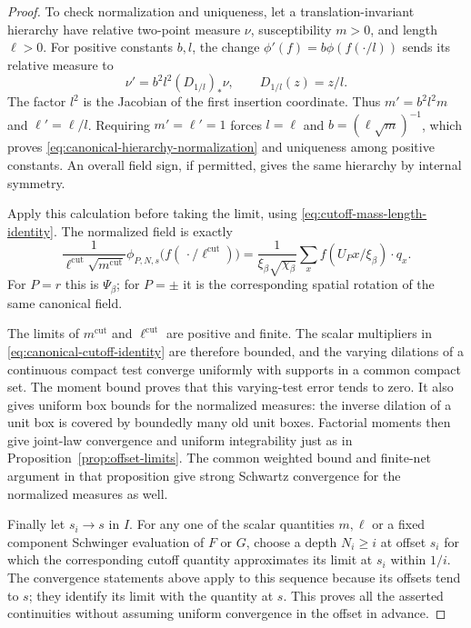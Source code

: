 \begin{proof}
To check normalization and uniqueness, let a translation-invariant
hierarchy have relative two-point measure $\nu$, susceptibility $m>0$,
and length $\ell>0$.  For positive constants $b,l$, the change
$\phi'(f)=b\phi(f(\cdot/l))$ sends its relative measure to
\[
 \nu'=b^2l^2(D_{1/l})_*\nu,\qquad D_{1/l}(z)=z/l.
\]
The factor $l^2$ is the Jacobian of the first insertion coordinate.
Thus $m'=b^2l^2m$ and $\ell'=\ell/l$.  Requiring $m'=\ell'=1$
forces $l=\ell$ and $b=(\ell\sqrt m)^{-1}$, which proves
\eqref{eq:canonical-hierarchy-normalization} and uniqueness among
positive constants.  An overall field sign, if permitted, gives the
same hierarchy by internal symmetry.

Apply this calculation before taking the limit, using
\eqref{eq:cutoff-mass-length-identity}.  The normalized field is exactly
\begin{equation}
 \frac{1}{\ell^{\mathrm{cut}}\sqrt{m^{\mathrm{cut}}}}
       \phi_{P,N,s}\bigl(f(\,\cdot/\ell^{\mathrm{cut}})\bigr)
  =\frac{1}{\xi_\beta\sqrt{\chi_\beta}}
       \sum_x f(U_Px/\xi_\beta)\cdot q_x.
 \label{eq:canonical-cutoff-identity}
\end{equation}
For $P=r$ this is $\Psi_\beta$; for $P=\pm$ it is the corresponding
spatial rotation of the same canonical field.

The limits of $m^{\mathrm{cut}}$ and $\ell^{\mathrm{cut}}$ are positive
and finite.  The scalar multipliers in
\eqref{eq:canonical-cutoff-identity} are therefore bounded, and the
varying dilations of a continuous compact test converge uniformly
with supports in a common compact set.  The moment bound proves that
this varying-test error tends to zero.  It also gives uniform box
bounds for the normalized measures: the inverse dilation of a unit box
is covered by boundedly many old unit boxes.  Factorial moments then
give joint-law convergence and uniform integrability just as in
Proposition~\ref{prop:offset-limits}.  The common weighted bound and
finite-net argument in that proposition give strong Schwartz
convergence for the normalized measures as well.

Finally let $s_i\to s$ in $I$.  For any one of the scalar quantities
$m,\ell$ or a fixed component Schwinger evaluation of $F$ or $G$, choose
a depth $N_i\ge i$ at offset $s_i$ for which the corresponding cutoff
quantity approximates its limit at $s_i$ within $1/i$.  The convergence
statements above apply to this sequence because its offsets tend to
$s$; they identify its limit with the quantity at $s$.  This proves
all the asserted continuities without assuming uniform convergence in
the offset in advance.
\end{proof}

